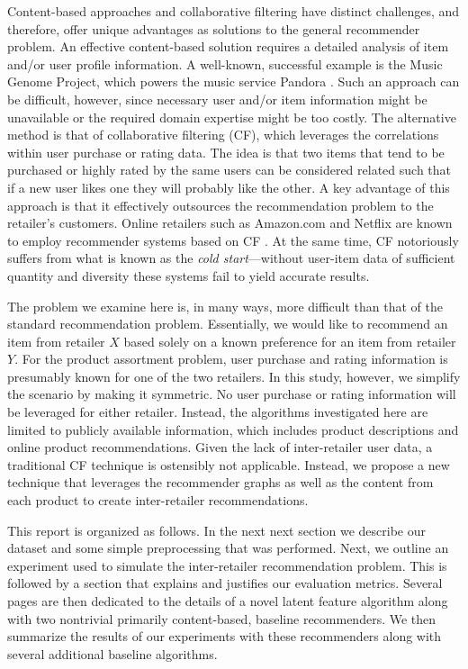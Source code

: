 \documentclass[11pt]{article}
\begin{document}
Content-based approaches and collaborative filtering have distinct challenges,
and therefore, offer unique advantages as solutions to the general recommender
problem.  An effective content-based solution requires a detailed analysis of
item and/or user profile information. A well-known, successful example is the
Music Genome Project, which powers the music service Pandora \cite{mgp}. Such an
approach can be difficult, however, since necessary user and/or item information
might be unavailable or the required domain expertise might be too costly. The
alternative method is that of collaborative filtering (CF), which leverages the
correlations within user purchase or rating data. The idea is that two items
that tend to be purchased or highly rated by the same users can be considered
related such that if a new user likes one they will probably like the other. A
key advantage of this approach is that it effectively outsources the
recommendation problem to the retailer's customers. Online retailers such as
Amazon.com and Netflix are known to employ recommender systems based on CF
\cite{Koren2009}. At the same time, CF notoriously suffers from what is known as
the {\em cold start}---without user-item data of sufficient quantity and
diversity these systems fail to yield accurate results.

The problem we examine here is, in many ways, more difficult than that of the
standard recommendation problem. Essentially, we would like to recommend an item
from retailer $X$ based solely on a known preference for an item from retailer
$Y$. For the product assortment problem, user purchase and rating information is
presumably known for one of the two retailers. In this study, however, we
simplify the scenario by making it symmetric. No user purchase or rating
information will be leveraged for either retailer. Instead, the algorithms
investigated here are limited to publicly available information, which includes
product descriptions and online product recommendations. Given the lack of
inter-retailer user data, a traditional CF technique is ostensibly not
applicable. Instead, we propose a new technique that leverages the recommender
graphs as well as the content from each product to create inter-retailer
recommendations.

This report is organized as follows. In the next next section we describe our
dataset and some simple preprocessing that was performed. Next, we outline an
experiment used to simulate the inter-retailer recommendation problem. This is
followed by a section that explains and justifies our evaluation metrics.
Several pages are then dedicated to the details of a novel latent feature
algorithm along with two nontrivial primarily content-based, baseline
recommenders. We then summarize the results of our experiments with these
recommenders along with several additional baseline algorithms. 
\end{document}
